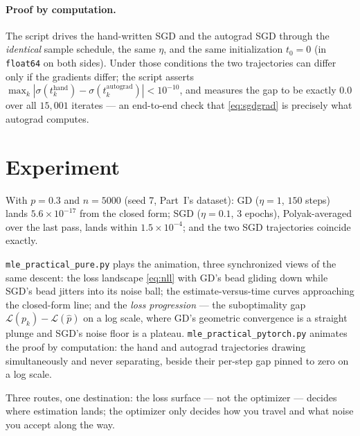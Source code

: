 \documentclass[11pt]{article}
\newcommand{\sigmoid}{\sigma}
\begin{document}
\paragraph{Proof by computation.}
The script drives the hand-written SGD and the autograd SGD through the
\emph{identical} sample schedule, the same $\eta$, and the same
initialization $t_0 = 0$ (in \texttt{float64} on both sides). Under
those conditions the two trajectories can differ only if the gradients
differ; the script asserts
$\max_k |\sigmoid(t_k^{\text{hand}}) - \sigmoid(t_k^{\text{autograd}})|
< 10^{-10}$, and measures the gap to be exactly $0.0$ over all
$15{,}001$ iterates --- an end-to-end check that \eqref{eq:sgdgrad} is
precisely what autograd computes.

\section{Experiment}

With $p = 0.3$ and $n = 5000$ (seed 7, Part~I's dataset):
GD ($\eta = 1$, $150$ steps) lands $5.6\times10^{-17}$ from the closed
form; SGD ($\eta = 0.1$, $3$ epochs), Polyak-averaged over the last
pass, lands within $1.5\times10^{-4}$; and the two SGD trajectories
coincide exactly.

\texttt{mle\_practical\_pure.py} plays the animation, three synchronized
views of the same descent: the loss landscape \eqref{eq:nll} with GD's
bead gliding down while SGD's bead jitters into its noise ball; the
estimate-versus-time curves approaching the closed-form line; and the
\emph{loss progression} --- the suboptimality gap
$\mathcal{L}(p_k) - \mathcal{L}(\hat p)$ on a log scale, where GD's
geometric convergence is a straight plunge and SGD's noise floor is a
plateau. \texttt{mle\_practical\_pytorch.py} animates the proof by
computation: the hand and autograd trajectories drawing simultaneously
and never separating, beside their per-step gap pinned to zero on a log
scale.

Three routes, one destination: the loss surface --- not the optimizer
--- decides where estimation lands; the optimizer only decides how you
travel and what noise you accept along the way.
\end{document}
